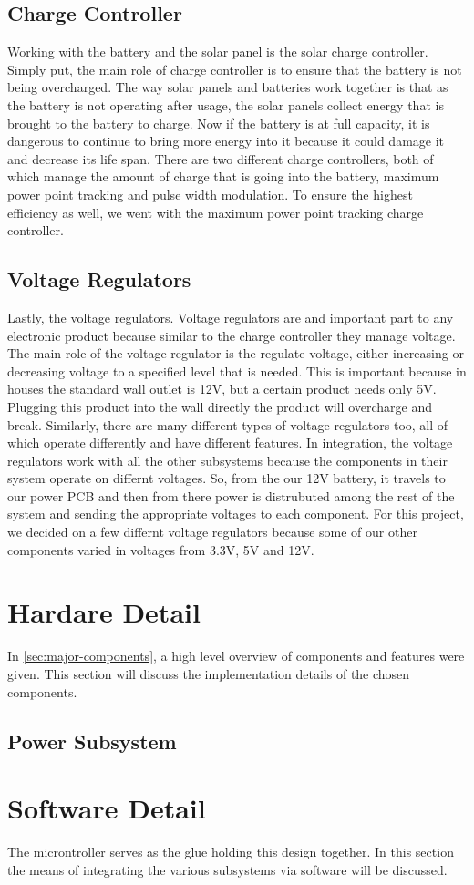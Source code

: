 \documentclass[journal]{IEEEtran}
\begin{document}
\subsection{Charge Controller} \label{sec:charge controller}
Working with the battery and the solar panel is the solar charge controller. Simply put, the main role of 
charge controller is to ensure that the battery is not being overcharged. The way solar panels and batteries 
work together is that as the battery is not operating after usage, the solar panels collect energy that 
is brought to the battery to charge. Now if the battery is at full capacity, it is dangerous to continue 
to bring more energy into it because it could damage it and decrease its life span. There are two different 
charge controllers, both of which manage the amount of charge that is going into the battery, maximum power 
point tracking and pulse width modulation. To ensure the highest efficiency as well, we went with the 
maximum power point tracking charge controller.
\subsection{Voltage Regulators} \label{sec:voltage regulator}
Lastly, the voltage regulators. Voltage regulators are and important part to any electronic product because 
similar to the charge controller they manage voltage. The main role of the voltage regulator is the regulate 
voltage, either increasing or decreasing voltage to a specified level that is needed. This is important 
because in houses the standard wall outlet is 12V, but a certain product needs only 5V. Plugging this product 
into the wall directly the product will overcharge and break. Similarly, there are many different types of 
voltage regulators too, all of which operate differently and have different features. In integration, the 
voltage regulators work with all the other subsystems because the components in their system operate on 
differnt voltages. So, from the our 12V battery, it travels to our power PCB and then from there power is 
distrubuted among the rest of the system and sending the appropriate voltages to each component. For this 
project, we decided on a few differnt voltage regulators because some of our other components varied in 
voltages from 3.3V, 5V and 12V. 

\section{Hardare Detail}
In \autoref{sec:major-components}, a high level overview of components and features were given. This
section will discuss the implementation details of the chosen components.
\subsection{Power Subsystem} \label{sec:power subsystem}

\section{Software Detail}
The microntroller serves as the glue holding this design together. In this section the means of
integrating the various subsystems via software will be discussed.
\end{document}
